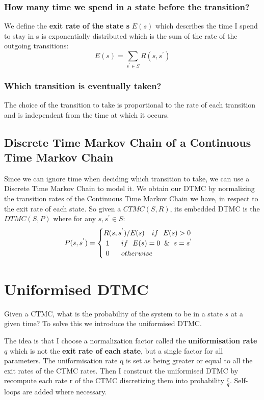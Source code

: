 \subsubsection{How many time we spend in a state before the transition?}
We define the \textbf{exit rate of the state s} $E(s)$ which describes the time I spend to stay in s is exponentially distributed which is the sum of the rate of the outgoing transitions:
\begin{equation*}
    E(s) = \sum_{s^{'} \in S} R(s, s^{'})    
\end{equation*}

\subsubsection{Which transition is eventually taken?}
The choice of the transition to take is proportional to the rate of each transition and is independent from the time at which it occurs.

\subsection{Discrete Time Markov Chain of a Continuous Time Markov Chain}
Since we can ignore time when deciding which transition to take, we can use a Discrete Time Markov Chain to model it. We obtain our DTMC by normalizing the transition rates of the Continuous Time Markov Chain we have, in respect to the exit rate of each state.
So given a $CTMC (S, R)$, its embedded DTMC is the $DTMC (S, P)$ where for any $s, s^{'} \in S$:
\[
P(s,s^{'}) =
\begin{cases}
    R(s, s^{'})/E(s) \ \ \ if \ \  E(s)>0\\\
    1 \ \ \ \ \ if \ \ E(s) = 0 \And s = s^{'}\\\
    0 \ \ \ \ \ otherwise
\end{cases}
\]

\section{Uniformised DTMC}
Given a CTMC, what is the probability of the system to be in a state $s$ at a given time? To solve this we introduce the uniformised DTMC.\par
The idea is that I choose a normalization factor called the \textbf{uniformisation rate} $q$ which is not the \textbf{exit rate of each state}, but a single factor for all parameters. The uniformisation rate q is set as being greater or equal to all the exit rates of the CTMC rates. Then I construct the uniformised DTMC by recompute each rate r of the CTMC discretizing them into probability $\frac{r}{q}$. Self-loops are added where necessary.

